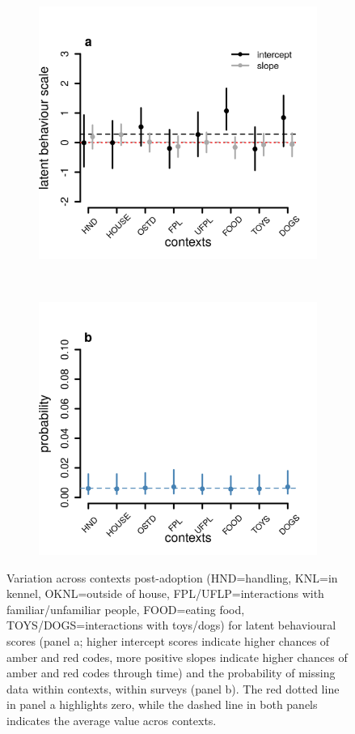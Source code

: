 \documentclass[12pt]{article}
\begin{document}
\begin{figure}[]
  \centering
  \begin{subfigure}{0.5\textwidth}
    \includegraphics[scale=0.6]{figures/figure_S2_a}
  \end{subfigure}%
  ~
  \begin{subfigure}{0.5\textwidth}
    \includegraphics[scale=0.6]{figures/figure_S2_b}
  \end{subfigure}%
\caption{Variation across contexts post-adoption  (HND=handling, KNL=in kennel, OKNL=outside of house, FPL/UFLP=interactions with familiar/unfamiliar people, FOOD=eating food, TOYS/DOGS=interactions with toys/dogs) for latent behavioural scores (panel a; higher intercept scores indicate higher chances of amber and red codes, more positive slopes indicate higher chances of amber and red codes through time) and the probability of missing data within contexts, within surveys (panel b). The red dotted line in panel a highlights zero, while the dashed line in both panels indicates the average value acros contexts.
}
\label{fig_2}
\end{figure}
\end{document}
